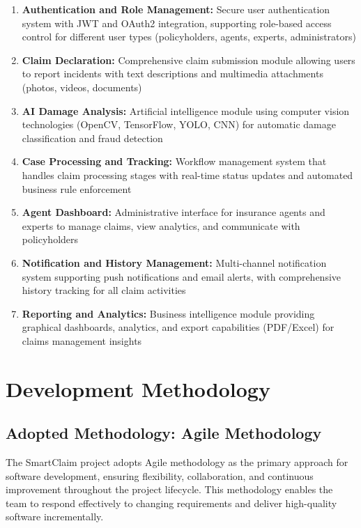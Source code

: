 \documentclass[12pt,a4paper]{report}
\begin{document}
\begin{enumerate}
    \item \textbf{Authentication and Role Management:} Secure user authentication system with JWT and OAuth2 integration, supporting role-based access control for different user types (policyholders, agents, experts, administrators)
    
    \item \textbf{Claim Declaration:} Comprehensive claim submission module allowing users to report incidents with text descriptions and multimedia attachments (photos, videos, documents)
    
    \item \textbf{AI Damage Analysis:} Artificial intelligence module using computer vision technologies (OpenCV, TensorFlow, YOLO, CNN) for automatic damage classification and fraud detection
    
    \item \textbf{Case Processing and Tracking:} Workflow management system that handles claim processing stages with real-time status updates and automated business rule enforcement
    
    \item \textbf{Agent Dashboard:} Administrative interface for insurance agents and experts to manage claims, view analytics, and communicate with policyholders
    
    \item \textbf{Notification and History Management:} Multi-channel notification system supporting push notifications and email alerts, with comprehensive history tracking for all claim activities
    
    \item \textbf{Reporting and Analytics:} Business intelligence module providing graphical dashboards, analytics, and export capabilities (PDF/Excel) for claims management insights
\end{enumerate}

\section{Development Methodology}

\subsection{Adopted Methodology: Agile Methodology}

The SmartClaim project adopts Agile methodology as the primary approach for software development, ensuring flexibility, collaboration, and continuous improvement throughout the project lifecycle. This methodology enables the team to respond effectively to changing requirements and deliver high-quality software incrementally.
\end{document}
